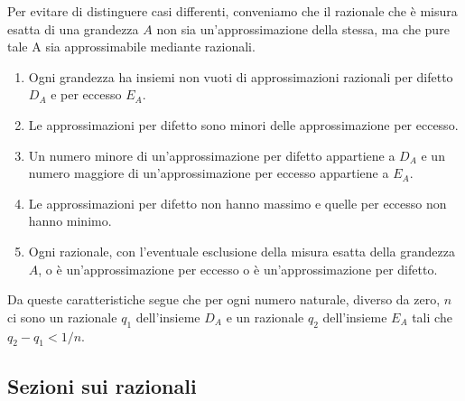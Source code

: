 
\begin{osservazione}
Per evitare di distinguere casi differenti, conveniamo che il razionale che 
è misura esatta di una grandezza \(A\) non sia un'approssimazione della 
stessa, ma che pure tale A sia approssimabile mediante razionali.
\begin{enumerate} [noitemsep]
\item 
Ogni grandezza ha insiemi non vuoti di approssimazioni razionali per 
difetto \(D_A\) e per eccesso \(E_A\). 
\item 
Le approssimazioni per difetto sono minori delle approssimazione per eccesso.
\item 
Un numero minore di un'approssimazione per difetto appartiene a \(D_A\) e un 
numero maggiore di un'approssimazione per eccesso appartiene a \(E_A\).
\item 
Le approssimazioni per difetto non hanno massimo e quelle per eccesso non 
hanno minimo.
\item 
Ogni razionale, con l'eventuale esclusione della misura esatta della 
grandezza \(A\), o è un'approssimazione per eccesso o è un'approssimazione 
per difetto.
\end{enumerate}
Da queste caratteristiche segue che per ogni numero naturale, diverso da 
zero, \(n\) ci sono un razionale \(q_1\) dell'insieme \(D_A\) e un razionale 
\(q_2\) dell'insieme \(E_A\) tali che \(q_2-q_1 < 1/n\).
\end{osservazione}

\subsection{Sezioni sui razionali}

